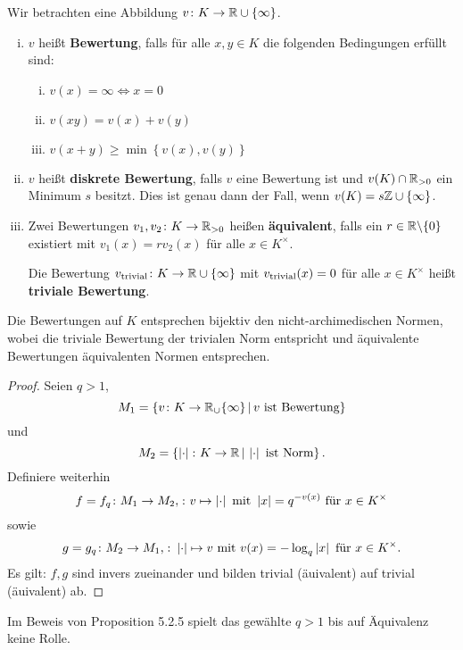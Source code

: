 \begin{defi}
Wir betrachten eine Abbildung $v\colon K \to \mathbb{R} \cup \{\infty \}$.
\begin{enumerate}[(i)]
\item $v$ heißt \textbf{Bewertung}, falls für alle $x,y \in K$ die folgenden Bedingungen erfüllt sind:
		\begin{enumerate}[(i)]
			\item $v(x) = \infty\Leftrightarrow x = 0$
			\item $v(xy) = v(x) + v(y)$
			\item $v(x+y) \geq \min \left\{ v(x), v(y) \right\}$
		\end{enumerate}
\item $v$ heißt \textbf{diskrete Bewertung}, falls $v$ eine Bewertung ist und $v(K) \cap \mathbb{R}_{>0}$ ein Minimum $s$ besitzt. Dies ist genau dann der Fall, wenn $v(K) = s\mathbb{Z} \cup \{\infty \}$.
\item Zwei Bewertungen $v_1, v_2 \colon K \to \mathbb{R}_{>0}$ heißen \textbf{äquivalent}, falls ein $r \in \mathbb{R}\backslash\{0\}$ existiert mit $v_1(x) = rv_2(x)$ für alle $x \in K^\times$.

Die Bewertung $v_{\operatorname{trivial}} \colon K \to \mathbb{R} \cup \{\infty \}$ mit $v_{\operatorname{trivial}}(x) = 0$ für alle $x \in K^\times$
heißt \textbf{triviale Bewertung}.
\end{enumerate}
\end{defi}


\begin{Prop}
Die Bewertungen auf $K$ entsprechen bijektiv den nicht-archimedischen Normen, wobei die triviale Bewertung der trivialen Norm entspricht und äquivalente Bewertungen äquivalenten Normen entsprechen.
\end{Prop}

\begin{proof}
Seien $q>1$,
\[ M_1 = \left\{ v\colon K \to \mathbb{R}_\cup\{\infty \} \, | \, v \text{ ist Bewertung}   \right\}
\]
und 
\[ M_2 = \left\{ \left|{\cdot}\right| \colon K \to \mathbb{R} \, | \, \left|{\cdot}\right| \text{ ist Norm}   \right\}.
\]
Definiere weiterhin
\[ f = f_q \colon M_1 \to M_2, \colon v \mapsto \left|{\cdot}\right|
\text{ mit } \left|{x}\right| = q^{-v(x)} \text{ für } x \in K^\times
\]
sowie
\[ g = g_q \colon M_2 \to M_1, \colon \left|{\cdot}\right| \mapsto v
\text{ mit } v(x)=-\log_q \left|{x}\right| \text{ für } x \in K^\times.
\]
Es gilt: $f,g$ sind invers zueinander und bilden trivial (äuivalent) auf trivial (äuivalent) ab.
\end{proof}


\begin{Bem}
Im Beweis von Proposition 5.2.5 spielt das gewählte $q>1$ bis auf Äquivalenz keine Rolle.
\end{Bem}

